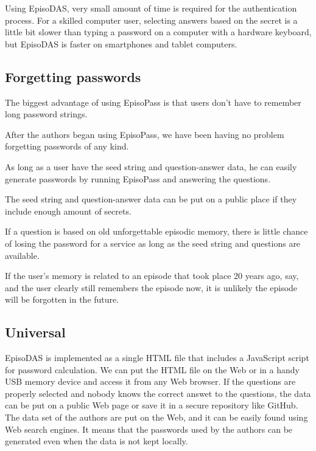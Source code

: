 \documentclass[sigconf]{acmart}
\begin{document}
Using EpisoDAS, very small amount of time is required for
the authentication process.
For a skilled computer user,
selecting answers based on the secret is a little bit slower than
typing a password on a computer with a hardware keyboard, but
EpisoDAS is faster on smartphones and tablet computers.


\subsection{Forgetting passwords}

The biggest advantage of using EpisoPass is that users don't have to
remember long password strings.

After the authors began using EpisoPass,
we have been having no problem forgetting passwords of any kind.

As long as a user have the seed string and question-answer data,
he can easily generate passwords by running
EpisoPass and answering the questions.

The seed string and question-answer data can be put on a public place
if they include enough amount of secrets.

If a question is based on old unforgettable episodic memory,
there is little chance of losing the password for a service
as long as the seed string and questions are available.

If the user's memory is related to an episode that took place 20 years
ago, say, and the user clearly still remembers the episode now, it is
unlikely the episode will be forgotten in the future.

\subsection{Universal}

EpisoDAS is implemented as a single HTML file that includes a JavaScript
script for password calculation.
We can put the HTML file on the Web or in a handy USB memory device
and access it from any Web browser.
If the questions are properly selected and nobody knows the correct answet to
the questions,
the data can be put on a public Web page or save it in a secure
repository like GitHub.
The data set of the authors are put on the Web, and it can be easily
found using Web search engines.
It means that the passwords used by the authors can be generated
even when the data is not kept locally.
\end{document}
